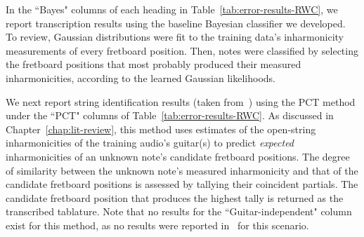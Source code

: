 \documentclass[12pt]{cmuthesis}
\begin{document}
In the ``Bayes" columns of each heading in Table~\ref{tab:error-results-RWC}, we report transcription results using the baseline Bayesian classifier we developed. To review, Gaussian distributions were fit to the training data's inharmonicity measurements of every fretboard position. Then, notes were classified by selecting the fretboard positions that most probably produced their measured inharmonicities, according to the learned Gaussian likelihoods.

We next report string identification results (taken from~\cite{barbanchoi2012}) using the PCT method under the ``PCT" columns of Table~\ref{tab:error-results-RWC}. As discussed in Chapter~\ref{chap:lit-review}, this method uses estimates of the open-string inharmonicities of the training audio's guitar(s) to predict \textit{expected} inharmonicities of an unknown note's candidate fretboard positions. The degree of similarity between the unknown note's measured inharmonicity and that of the candidate fretboard positions is assessed by tallying their coincident partials. The candidate fretboard position that produces the highest tally is returned as the transcribed tablature. Note that no results for the ``Guitar-independent" column exist for this method, as no results were reported in~\cite{barbanchoi2012} for this scenario.

\end{document}
